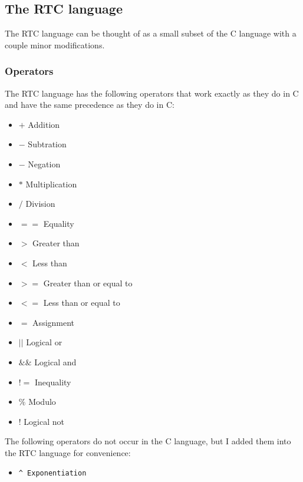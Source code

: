 
\subsection{The RTC language}

The RTC language can be thought of as a small subset of the
C language with a couple minor modifications. 

\subsubsection{Operators}

The RTC language has the following operators that work exactly as they do in C
and have the same precedence as they do in C:
\begin{itemize}
  \item $+$  Addition
  \item $-$  Subtration
  \item $-$  Negation
  \item $*$  Multiplication
  \item $/$  Division
  \item $==$ Equality
  \item $>$  Greater than
  \item $<$  Less than
  \item $>=$ Greater than or equal to
  \item $<=$ Less than or equal to
  \item $=$  Assignment
  \item $||$ Logical or
  \item $\&\&$ Logical and
  \item $!=$ Inequality
  \item $\%$ Modulo
  \item $!$  Logical not
\end{itemize}

\noindent The following operators do not occur in the C language, but
I added them into the RTC language for convenience:

\begin{itemize}
  \item \begin{verbatim}^ Exponentiation \end{verbatim}
\end{itemize}



